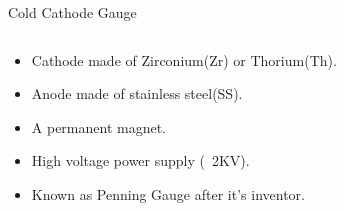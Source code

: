 \documentclass[11pt]{beamer}
\begin{document}
\begin{frame}{Cold Cathode Gauge}
\begin{columns}[]
       \begin{exampleblock}{ }
         
          \begin{itemize}
          		\item Cathode made of Zirconium(Zr) or Thorium(Th). 
          		\item Anode made of stainless steel(SS).
          		\item A permanent magnet.
          		\item High voltage power supply (~2KV).
          		\item Known as \alert{Penning Gauge} after it’s inventor.
          \end{itemize}
       
       \end{exampleblock}   
   
    \end{columns}   

\end{frame}
\end{document}
